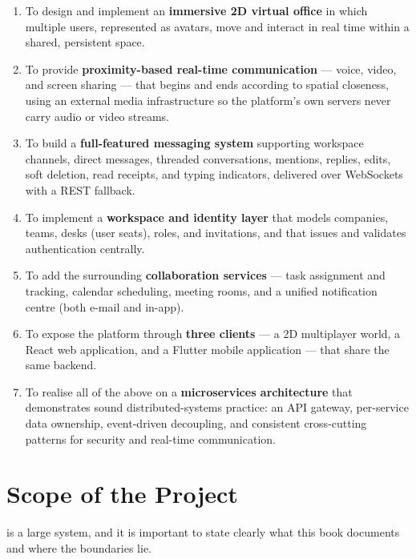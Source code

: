 \begin{enumerate}
  \item To design and implement an \textbf{immersive 2D virtual office} in which
  multiple users, represented as avatars, move and interact in real time within
  a shared, persistent space.

  \item To provide \textbf{proximity-based real-time communication} --- voice,
  video, and screen sharing --- that begins and ends according to spatial
  closeness, using an external media infrastructure so the platform's own
  servers never carry audio or video streams.

  \item To build a \textbf{full-featured messaging system} supporting workspace
  channels, direct messages, threaded conversations, mentions, replies, edits,
  soft deletion, read receipts, and typing indicators, delivered over WebSockets
  with a REST fallback.

  \item To implement a \textbf{workspace and identity layer} that models
  companies, teams, desks (user seats), roles, and invitations, and that issues
  and validates authentication centrally.

  \item To add the surrounding \textbf{collaboration services} --- task
  assignment and tracking, calendar scheduling, meeting rooms, and a unified
  notification centre (both e-mail and in-app).

  \item To expose the platform through \textbf{three clients} --- a 2D
  multiplayer world, a React web application, and a Flutter mobile application ---
  that share the same backend.

  \item To realise all of the above on a \textbf{microservices architecture}
  that demonstrates sound distributed-systems practice: an API gateway, per-service
  data ownership, event-driven decoupling, and consistent cross-cutting patterns
  for security and real-time communication.
\end{enumerate}

\section{Scope of the Project}

\voname{} is a large system, and it is important to state clearly what this book
documents and where the boundaries lie.

